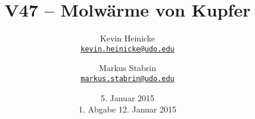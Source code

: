 


\title{%
    V47 -- Molwärme von Kupfer
}
\author{%
    Kevin Heinicke\\
    \texttt{\href{mailto:kevin.heinicke@udo.edu}{kevin.heinicke@udo.edu}}
    \and
    Markus Stabrin\\
    \texttt{\href{mailto:markus.stabrin@udo.edu}{markus.stabrin@udo.edu}}
}
\date{%
    5. Januar 2015\\
    {\small 1. Abgabe} 12. Januar 2015
}

    \maketitle%
    \tableofcontents
    \newpage

    
    
    
    \printbibliography

